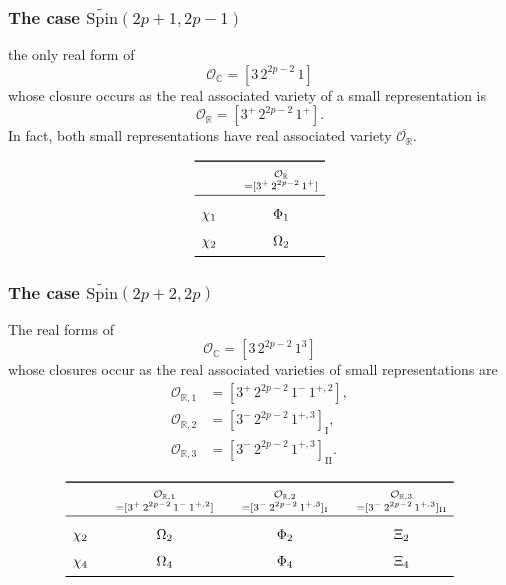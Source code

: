 \documentclass{amsart}
\newcommand{\bbC}{{\mathbb{C}}}
\newcommand{\bbR}{{\mathbb R}}
\newcommand{\Spin}{{\mathrm{Spin}}}
\theoremstyle{definition}
\newcommand{\tu}{\widetilde}
\begin{document}
\subsubsection{The case \(\tu{\Spin}(2p+1,2p-1)\)}

the only real form of
\[
\mathcal O_{\bbC}=[3\,2^{2p-2}\,1]
\]
whose closure occurs as the real associated variety  of a small representation is
\[
\mathcal O_{\bbR}
=
[3^+\,2^{2p-2}\,1^+].
\]
In fact, both small representations have real associated variety
\(\overline{\mathcal O_{\bbR}}\).

\[
\renewcommand{\arraystretch}{1.6}
\begin{array}{c@{\qquad}c}
\toprule
&
\substack{
\mathcal O_{\bbR}\\
=[3^+\,2^{2p-2}\,1^+]
}
\\
\midrule
\chi_1
&
 \Phi_1
\\
\chi_2
&
\Omega_2
\\
\bottomrule
\end{array}
\]

\subsubsection{The case \(\tu{\Spin}(2p+2,2p)\)}

The real forms of
\[
\mathcal O_{\bbC}=[3\,2^{2p-2}\,1^3]
\]
whose closures occur as the real associated varieties of small representations are
\[
\begin{aligned}
\mathcal O_{\bbR,1}
&=
[3^+\,2^{2p-2}\,1^-\,1^{+,2}],\\
\mathcal O_{\bbR,2}
&=
[3^-\,2^{2p-2}\,1^{+,3}]_{\mathrm{I}},\\
\mathcal O_{\bbR,3}
&=
[3^-\,2^{2p-2}\,1^{+,3}]_{\mathrm{II}}.
\end{aligned}
\]

\[
\renewcommand{\arraystretch}{1.6}
\begin{array}{
c@{\qquad}
c@{\qquad}
c@{\qquad}
c
}
\toprule
&
\substack{
\mathcal O_{\bbR,1}\\
=[3^+\,2^{2p-2}\,1^-\,1^{+,2}]
}
&
\substack{
\mathcal O_{\bbR,2}\\
=[3^-\,2^{2p-2}\,1^{+,3}]_{\mathrm{I}}
}
&
\substack{
\mathcal O_{\bbR,3}\\
=[3^-\,2^{2p-2}\,1^{+,3}]_{\mathrm{II}}
}
\\
\midrule
\chi_2
&
\Omega_2
&
\Phi_2
&
\Xi_2
\\
\chi_4
&
\Omega_4
&
\Phi_4
&
\Xi_4
\\
\bottomrule
\end{array}
\]
\end{document}
